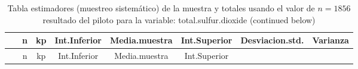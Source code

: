 \documentclass[
]{article}
\begin{document}
\begin{longtable}[]{@{}cccccccc@{}}
\caption{Tabla estimadores (muestreo sistemático) de la muestra y
totales usando el valor de \(n = 1856\) resultado del piloto para la
variable: total.sulfur.dioxide (continued below)}\tabularnewline
\toprule
\begin{minipage}[b]{0.18\columnwidth}\centering
~\strut
\end{minipage} & \begin{minipage}[b]{0.05\columnwidth}\centering
n\strut
\end{minipage} & \begin{minipage}[b]{0.03\columnwidth}\centering
kp\strut
\end{minipage} & \begin{minipage}[b]{0.10\columnwidth}\centering
Int.Inferior\strut
\end{minipage} & \begin{minipage}[b]{0.11\columnwidth}\centering
Media.muestra\strut
\end{minipage} & \begin{minipage}[b]{0.10\columnwidth}\centering
Int.Superior\strut
\end{minipage} & \begin{minipage}[b]{0.12\columnwidth}\centering
Desviacion.std.\strut
\end{minipage} & \begin{minipage}[b]{0.08\columnwidth}\centering
Varianza\strut
\end{minipage}\tabularnewline
\midrule
\endfirsthead
\toprule
\begin{minipage}[b]{0.18\columnwidth}\centering
~\strut
\end{minipage} & \begin{minipage}[b]{0.05\columnwidth}\centering
n\strut
\end{minipage} & \begin{minipage}[b]{0.03\columnwidth}\centering
kp\strut
\end{minipage} & \begin{minipage}[b]{0.10\columnwidth}\centering
Int.Inferior\strut
\end{minipage} & \begin{minipage}[b]{0.11\columnwidth}\centering
Media.muestra\strut
\end{minipage} & \begin{minipage}[b]{0.10\columnwidth}\centering
Int.Superior\strut
\end{minipage} & \begin{minipage}[b]{0.12\columnwidth}\centering

\end{minipage}
\end{longtable}
\end{document}
